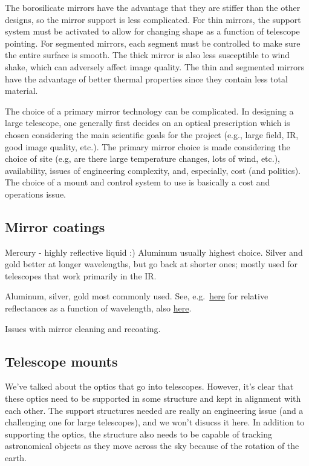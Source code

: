 \documentclass[12pt]{article}
\begin{document}
The borosilicate mirrors have the advantage that they are stiffer than
the other designs, so the mirror support is less complicated. For thin
mirrors, the support system must be activated to allow for changing
shape as a function of telescope pointing. For segmented mirrors, each
segment must be controlled to make sure the entire surface is smooth.
The thick mirror is also less susceptible to wind shake, which can
adversely affect image quality. The thin and segmented mirrors have
the advantage of better thermal properties since they contain less
total material.

The choice of a primary mirror technology can be complicated. In
designing a large telescope, one generally first decides on an optical
prescription which is chosen considering the main scientific goals for
the project (e.g., large field, IR, good image quality, etc.). The
primary mirror choice is made considering the choice of site (e.g, are
there large temperature changes, lots of wind, etc.), availability,
issues of engineering complexity, and, especially, cost (and
politics). The choice of a mount and control system to use is
basically a cost and operations issue.


\subsection{Mirror coatings}
\textcolor{myBlue}{Mercury - highly reflective liquid :)
Aluminum usually highest choice. Silver and gold better at longer wavelengths,
but go back at shorter ones; mostly used for telescopes that work primarily
in the IR\@.}

Aluminum, silver, gold most commonly used. See, e.g.\
\href{http://www.optiforms.com/optical-coatings/}
{here} for relative reflectances as a function of wavelength, also
\href{https://en.wikipedia.org/wiki/Reflectance}{here}.

Issues with mirror cleaning and recoating.

\subsection{Telescope mounts}
We've talked about the optics that go into telescopes. However, it's
clear that these optics need to be supported in some structure and
kept in alignment with each other. The support structures needed are
really an engineering issue (and a challenging one for large
telescopes), and we won't disucss it here. In addition to supporting
the optics, the structure also needs to be capable of tracking
astronomical objects as they move across the sky because of the
rotation of the earth.
\end{document}
